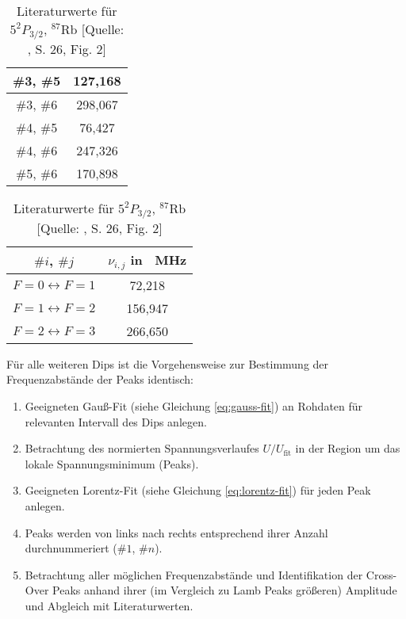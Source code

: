 \begin{table}[H]
\begin{minipage}{8cm}
\begin{tabular}{|c|c|}
            \hline
            \cellcolor{red!20}   \#3, \#5       &   \cellcolor{red!20}      127,168         \\
            \hline          
            \cellcolor{red!20}   \#3, \#6       &   \cellcolor{red!20}      298,067         \\
            \hline
            \cellcolor{red!20}   \#4, \#5       &   \cellcolor{red!20}       76,427         \\
            \hline
            \cellcolor{green!40} \#4, \#6       &   \cellcolor{green!40}    247,326         \\
            \hline
            \cellcolor{red!20}   \#5, \#6       &   \cellcolor{red!20}      170,898         \\
            \hline
        \end{tabular}
        \caption{Errechnete Frequenzabstände  der Peaks für Dip \textcolor{red!80!black}{\#1}}
        \label{tab:plot-data20-gain30-01-dip-1}
    \end{minipage}
    \hskip0.5cm
    \begin{minipage}{8cm}
        \centering
        \begin{tabular}{|c|c|}
            \hline
            $\#i$, $\#j$    &   $\nu_{i,j}$ in \SI{}{\mega \hertz}  \\
            \hline
            \hline
             $F = 0 \longleftrightarrow F = 1$      &        72,218     \\
            \hline
             $F = 1 \longleftrightarrow F = 2$      &       156,947     \\
            \hline
             $F = 2 \longleftrightarrow F = 3$      &       266,650     \\
            \hline
        \end{tabular}
        \caption{Literaturwerte für $5^{2}P_{3/2}$, $^{87}\text{Rb}$ [Quelle: \cite{Steck87}, S. 26, Fig. 2]}
        \label{tab:lit-5p-87-rb}
    \end{minipage}
\end{table}

\noindent Für alle weiteren Dips ist die Vorgehensweise zur Bestimmung der Frequenzabstände der Peaks identisch:
\begin{enumerate}[1.]
    \item Geeigneten Gauß-Fit (siehe Gleichung \eqref{eq:gauss-fit}) an Rohdaten für relevanten Intervall des Dips anlegen.
    \item Betrachtung des normierten Spannungsverlaufes $U/U_{\text{fit}}$ in der Region um das lokale Spannungsminimum (Peaks).
    \item Geeigneten Lorentz-Fit (siehe Gleichung \eqref{eq:lorentz-fit}) für jeden Peak anlegen.
    \item Peaks werden von links nach rechts entsprechend ihrer Anzahl durchnummeriert ($\#1$, $\#n$).
    \item Betrachtung aller möglichen Frequenzabstände und Identifikation der Cross-Over Peaks anhand ihrer (im Vergleich zu Lamb Peaks größeren) Amplitude und Abgleich mit Literaturwerten.
\end{enumerate}


